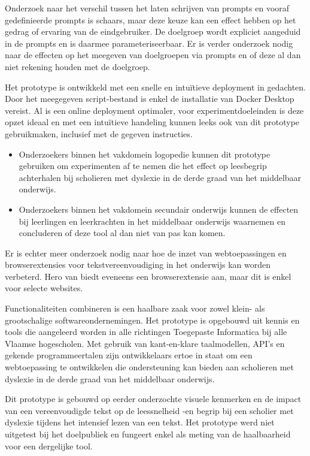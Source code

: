 Onderzoek naar het verschil tussen het laten schrijven van prompts en vooraf gedefinieerde prompts is schaars, maar deze keuze kan een effect hebben op het gedrag of ervaring van de eindgebruiker. De doelgroep wordt expliciet aangeduid in de prompts en is daarmee parameteriseerbaar. Er is verder onderzoek nodig naar de effecten op het meegeven van doelgroepen via prompts en of deze al dan niet rekening houden met de doelgroep. 

\medspace

Het prototype is ontwikkeld met een snelle en intuïtieve deployment in gedachten. Door het meegegeven script-bestand is enkel de installatie van Docker Desktop vereist. Al is een online deployment optimaler, voor experimentdoeleinden is deze opzet ideaal en met een intuïtieve handeling kunnen leeks ook van dit prototype gebruikmaken, inclusief met de gegeven instructies. 

\begin{itemize}
	\item Onderzoekers binnen het vakdomein logopedie kunnen dit prototype gebruiken om experimenten af te nemen die het effect op leesbegrip achterhalen bij scholieren met dyslexie in de derde graad van het middelbaar onderwijs. 
	\item Onderzoekers binnen het vakdomein secundair onderwijs kunnen de effecten bij leerlingen en leerkrachten in het middelbaar onderwijs waarnemen en concluderen of deze tool al dan niet van pas kan komen. 
\end{itemize}

\medspace

Er is echter meer onderzoek nodig naar hoe de inzet van webtoepassingen en browserextensies voor tekstvereenvoudiging in het onderwijs kan worden verbeterd. Hero van \textcite{Bingel2018} biedt eveneens een browserextensie aan, maar dit is enkel voor selecte websites. 


\medspace

Functionaliteiten combineren is een haalbare zaak voor zowel klein- als grootschalige softwareondernemingen. Het prototype is opgebouwd uit kennis en tools die aangeleerd worden in alle richtingen Toegepaste Informatica bij alle Vlaamse hogescholen. Met gebruik van kant-en-klare taalmodellen, API's en gekende programmeertalen zijn ontwikkelaars ertoe in staat om een webtoepassing te ontwikkelen die ondersteuning kan bieden aan scholieren met dyslexie in de derde graad van het middelbaar onderwijs. 


Dit prototype is gebouwd op eerder onderzochte visuele kenmerken en de impact van een vereenvoudigde tekst op de leessnelheid -en begrip bij een scholier met dyslexie tijdens het intensief lezen van een tekst. Het prototype werd niet uitgetest bij het doelpubliek en fungeert enkel als meting van de haalbaarheid voor een dergelijke tool. 